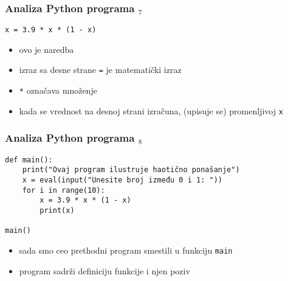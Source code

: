 \documentclass[utf8,compress]{beamer}
\begin{document}
\begin{frame}[fragile]
\frametitle{Analiza Python programa $_7$}
\begin{verbatim}
x = 3.9 * x * (1 - x)
\end{verbatim}
\begin{itemize}
  \item ovo je naredba 
  \item izraz sa desne strane \texttt{=} je matematički izraz
  \item \texttt{*} označava množenje
  \item kada se vrednost na desnoj strani izračuna,  (upisuje se) promenljivoj \texttt{x} 
\end{itemize}
\end{frame}

\begin{frame}[fragile]
\frametitle{Analiza Python programa $_8$}
\begin{verbatim}
def main():
    print("Ovaj program ilustruje haotično ponašanje")
    x = eval(input("Unesite broj između 0 i 1: "))
    for i in range(10):
        x = 3.9 * x * (1 - x)
        print(x)

main()
\end{verbatim}
\begin{itemize}
  \item sada smo ceo prethodni program smestili u funkciju \texttt{main}
  \item program sadrži definiciju funkcije i njen poziv
\end{itemize}
\end{frame}
\end{document}
